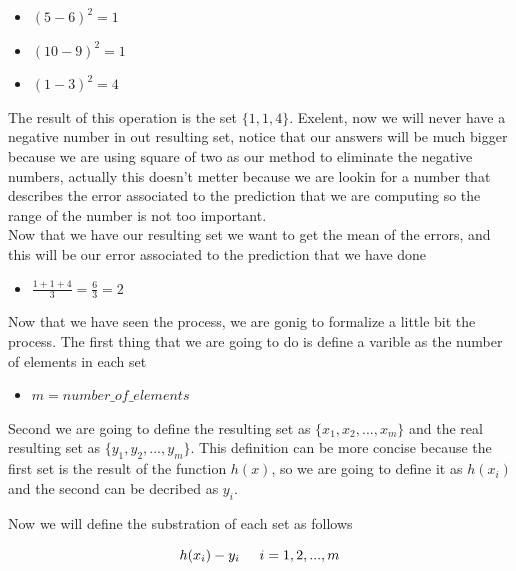 \documentclass[12pt,journal]{IEEEtran}
\begin{document}
    \begin{itemize}
        \item $(5-6)^2 = 1$
        \item $(10-9)^2 = 1$
        \item $(1-3)^2 = 4$\\
    \end{itemize}

    The result of this operation is the set $\{1,1,4\}$. Exelent, now we will
    never have a negative number in out resulting set, notice that our
    answers will be much bigger because we are using square of two as our
    method to eliminate the negative numbers, actually this doesn't metter
    because we are lookin for a number that describes the error associated to
    the prediction that we are computing so the range of the number is not too
    important.\\

    Now that we have our resulting set we want to get the mean of the errors,
    and this will be our error associated to the prediction that we have done\\

    \begin{itemize}
        \item $\frac{1+1+4}{3} = \frac{6}{3} = 2$ \\
    \end{itemize}

    Now that we have seen the process, we are gonig to formalize a little bit
    the process. The first thing that we are going to do is define a varible as
    the number of elements in each set \\

    \begin{itemize}
        \item $m = number\_of\_elements$ \\
    \end{itemize}

    Second we are going to define the resulting set as $\{x_1,x_2, ... , x_m\}$
    and the real resulting set as $\{y_1,y_2, ... , y_m\}$. This definition can
    be more concise because the first set is the result of the function $h(x)$,
    so we are going to define it as $h(x_i)$ and the second can be decribed as
    $y_i$.

    Now we will define the substration of each set as follows

    \begin{equation}
        h(x_i) - y_i \hspace{0.5cm} i=1, 2, ..., m
    \end{equation}
\end{document}
